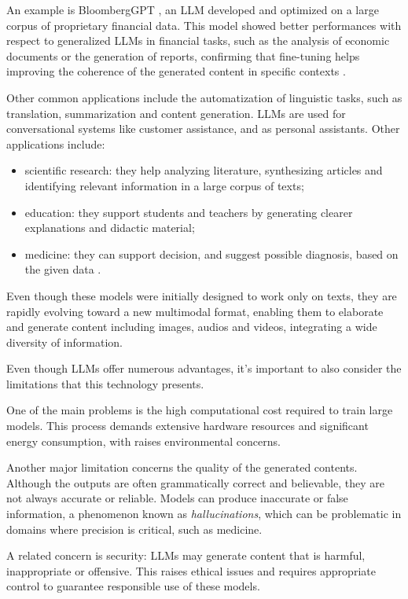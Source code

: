 An example is BloombergGPT \cite{wu2023bloomberggptlargelanguagemodel}, an LLM developed and optimized on a large corpus of proprietary financial data. This model showed better performances with respect to generalized LLMs in financial tasks, such as the analysis of economic documents or the generation of reports, confirming that fine-tuning helps improving the coherence of the generated content in specific contexts \cite{wang2025llm}.

\medskip
Other common applications include the automatization of linguistic tasks, such as translation, summarization and content generation. LLMs are used for conversational systems like customer assistance, and as personal assistants.
Other applications include:
\begin{itemize}
    \item scientific research: they help analyzing literature, synthesizing articles and identifying relevant information in a large corpus of texts;
    \item education: they support students and teachers by generating clearer explanations and didactic material;
    \item medicine: they can support decision, and suggest possible diagnosis, based on the given data \cite{wang2025llm}.
\end{itemize}

\medskip
Even though these models were initially designed to work only on texts, they are rapidly evolving toward a new multimodal format, enabling them to elaborate and generate content including images, audios and videos, integrating a wide diversity of information.


\medskip
Even though LLMs offer numerous advantages, it's important to also consider the limitations that this technology presents.

One of the main problems is the high computational cost required to train large models.
This process demands extensive hardware resources and significant energy consumption, with raises environmental concerns.

Another major limitation concerns the quality of the generated contents. Although the outputs are often grammatically correct and believable, they are not always accurate or reliable. Models can produce inaccurate or false information, a phenomenon known as \textit{hallucinations}, which can be problematic in domains where precision is critical, such as medicine.

A related concern is security: LLMs may generate content that is harmful, inappropriate or offensive. This raises ethical issues and requires appropriate control to guarantee responsible use of these models.

